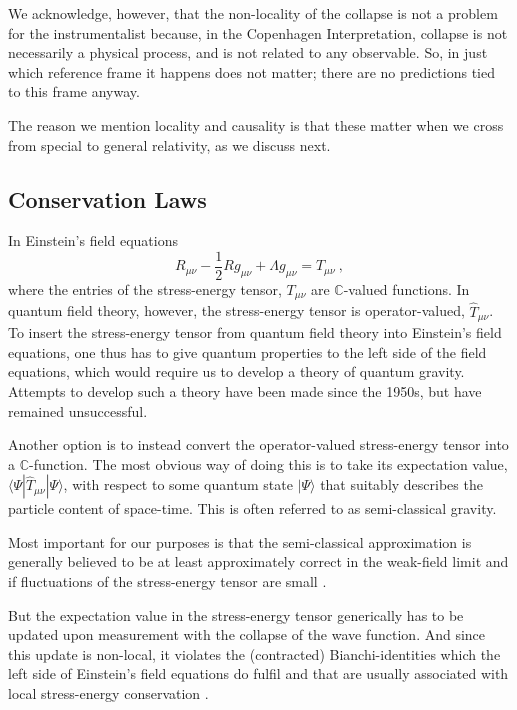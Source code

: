 \documentclass[superscriptaddress,floatfix,nofootinbib,12pt]{revtex4-2}
\begin{document}
We acknowledge, however, that the non-locality of the collapse is not a problem for the instrumentalist because, in the Copenhagen Interpretation, collapse is not necessarily a physical process, and is not related to any observable. So, in just which reference frame it happens does not matter; there are no predictions tied to this frame anyway. 

The reason we mention locality and causality is that these matter when we cross from special to general relativity, as we discuss next.

\subsection{Conservation Laws}

In Einstein's field equations
\begin{equation}
R_{\mu\nu} - \frac{1}{2} R g_{\mu \nu} + \Lambda g_{\mu \nu} = T_{\mu \nu}~,
\end{equation}
where the entries of the stress-energy tensor, $T_{\mu\nu}$ are $\mathbb{C}$-valued functions. In quantum field theory, however, the stress-energy tensor is operator-valued, $\hat T_{\mu \nu}$. 
To insert the stress-energy tensor from quantum field theory into Einstein's field equations, one thus has to give quantum properties to the left side of the field equations, which would require us to develop a theory of quantum gravity. Attempts to develop such a theory have been made since the 1950s, but have remained unsuccessful.

Another option is to instead convert the operator-valued stress-energy tensor into a $\mathbb{C}$-function. The most obvious way of doing this is to take its expectation value, $\langle \Psi| \hat T_{\mu \nu} |\Psi \rangle$, with respect to some quantum state $|\Psi\rangle$ that suitably describes the particle content of space-time. This is often referred to as semi-classical gravity. 

Most important for our purposes is that the semi-classical approximation is generally believed to be at least approximately correct in the weak-field limit and if fluctuations of the stress-energy tensor are small \cite{ford1982gravitational,Kuo1993SemiclassGrav}.

But the expectation value in the stress-energy tensor generically has to be updated upon measurement with the collapse of the wave function. And since this update is non-local, it violates the (contracted) Bianchi-identities which the left side of Einstein's field equations do fulfil and that are usually associated with local stress-energy conservation \cite{weinberg1972gravitation,Misner1973gravitation}.
\end{document}
